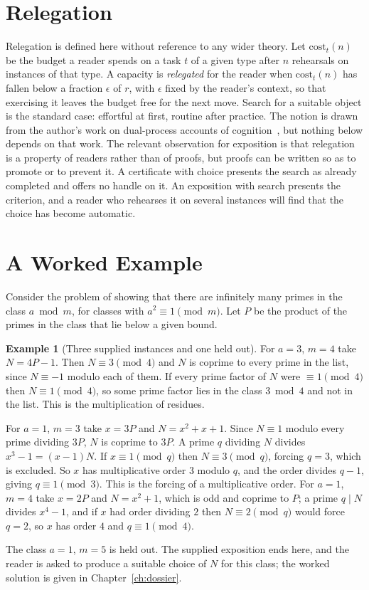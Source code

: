 \documentclass[11pt]{book}
\theoremstyle{definition}
\newtheorem{example}[theorem]{Example}
\theoremstyle{remark}
\begin{document}
\section{Relegation}

Relegation is defined here without reference to any wider theory. Let $\mathrm{cost}_t(n)$ be the budget a reader spends on a task $t$ of a given type after $n$ rehearsals on instances of that type. A capacity is \emph{relegated} for the reader when $\mathrm{cost}_t(n)$ has fallen below a fraction $\epsilon$ of $r$, with $\epsilon$ fixed by the reader's context, so that exercising it leaves the budget free for the next move. Search for a suitable object is the standard case: effortful at first, routine after practice. The notion is drawn from the author's work on dual-process accounts of cognition~\cite{flyxion-art}, but nothing below depends on that work. The relevant observation for exposition is that relegation is a property of readers rather than of proofs, but proofs can be written so as to promote or to prevent it. A certificate with choice presents the search as already completed and offers no handle on it. An exposition with search presents the criterion, and a reader who rehearses it on several instances will find that the choice has become automatic.

\section{A Worked Example}

Consider the problem of showing that there are infinitely many primes in the class $a\bmod m$, for classes with $a^2\equiv1\pmod m$. Let $P$ be the product of the primes in the class that lie below a given bound.

\begin{example}[Three supplied instances and one held out]\label{ex:criterion}
For $a=3$, $m=4$ take $N=4P-1$. Then $N\equiv3\pmod4$ and $N$ is coprime to every prime in the list, since $N\equiv-1$ modulo each of them. If every prime factor of $N$ were $\equiv1\pmod 4$ then $N\equiv1\pmod4$, so some prime factor lies in the class $3\bmod4$ and not in the list. This is the multiplication of residues.

For $a=1$, $m=3$ take $x=3P$ and $N=x^2+x+1$. Since $N\equiv1$ modulo every prime dividing $3P$, $N$ is coprime to $3P$. A prime $q$ dividing $N$ divides $x^3-1=(x-1)N$. If $x\equiv1\pmod q$ then $N\equiv3\pmod q$, forcing $q=3$, which is excluded. So $x$ has multiplicative order $3$ modulo $q$, and the order divides $q-1$, giving $q\equiv1\pmod3$. This is the forcing of a multiplicative order. For $a=1$, $m=4$ take $x=2P$ and $N=x^2+1$, which is odd and coprime to $P$; a prime $q\mid N$ divides $x^4-1$, and if $x$ had order dividing $2$ then $N\equiv2\pmod q$ would force $q=2$, so $x$ has order $4$ and $q\equiv1\pmod4$.

The class $a=1$, $m=5$ is held out. The supplied exposition ends here, and the reader is asked to produce a suitable choice of $N$ for this class; the worked solution is given in Chapter~\ref{ch:dossier}.
\end{example}
\end{document}

